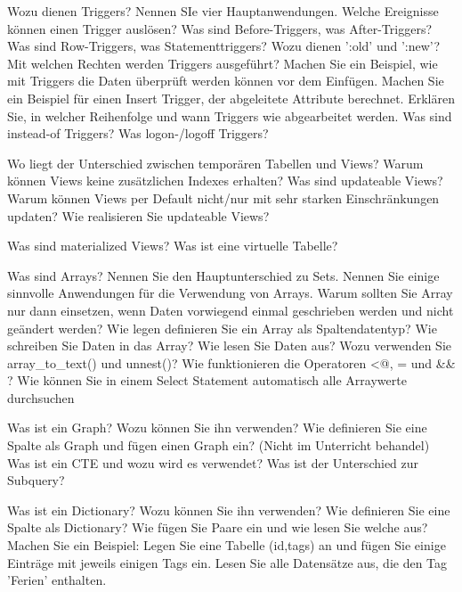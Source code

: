 \documentclass[ngerman,a4paper,12pt]{scrreprt}
\begin{document}
\olR
	\li Wozu dienen Triggers? Nennen SIe vier Hauptanwendungen.
	\li Welche Ereignisse können einen Trigger auslösen?
	\li Was sind Before-Triggers, was After-Triggers? Was sind Row-Triggers, was Statementtriggers?
	\li Wozu dienen ':old' und ':new'?
	\li Mit welchen Rechten werden Triggers ausgeführt?
	\li Machen Sie ein Beispiel, wie mit Triggers die Daten überprüft werden können vor dem Einfügen.
	\li Machen Sie ein Beispiel für einen Insert Trigger, der abgeleitete Attribute berechnet.
	\li Erklären Sie, in welcher Reihenfolge und wann Triggers wie abgearbeitet werden.
	\li Was sind instead-of Triggers? Was logon-/logoff Triggers?
\olS

\olR
	\li Wo liegt der Unterschied zwischen temporären Tabellen und Views?
	\li Warum können Views keine zusätzlichen Indexes erhalten?
	\li Was sind updateable Views? Warum können Views per Default nicht/nur mit sehr starken Einschränkungen updaten?
	\li Wie realisieren Sie updateable Views?
\olS

\olR
	\li Was sind materialized Views?
	\li Was ist eine virtuelle Tabelle?
\olS


\olR
	\li Was sind Arrays?
	\li Nennen Sie den Hauptunterschied zu Sets.
	\li Nennen Sie einige sinnvolle Anwendungen für die Verwendung von Arrays.
	\li Warum sollten Sie Array nur dann einsetzen, wenn Daten vorwiegend einmal geschrieben werden und nicht geändert werden?
	\li Wie legen definieren Sie ein Array als Spaltendatentyp? Wie schreiben Sie Daten in das Array? Wie lesen Sie Daten aus?
	\li Wozu verwenden Sie array\_to\_text() und unnest()?
	\li Wie funktionieren die Operatoren <@, = und \&\& ?
	\li Wie können Sie in einem Select Statement automatisch alle Arraywerte durchsuchen
\olS

\olR
	\li Was ist ein Graph? Wozu können Sie ihn verwenden?
	\li Wie definieren Sie eine Spalte als Graph und fügen einen Graph ein? (Nicht im Unterricht behandel)
	\li Was ist ein CTE und wozu wird es verwendet? Was ist der Unterschied zur Subquery?
\olS

\olR
	\li Was ist ein Dictionary? Wozu können Sie ihn verwenden?
	\li Wie definieren Sie eine Spalte als Dictionary? Wie fügen Sie Paare ein und wie lesen Sie welche aus?
	\li Machen Sie ein Beispiel: Legen Sie eine Tabelle (id,tags) an und fügen Sie einige Einträge mit jeweils einigen Tags ein. Lesen Sie alle Datensätze aus, die den Tag 'Ferien' enthalten.
\olS
\end{document}
